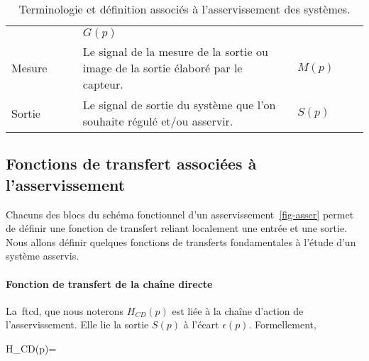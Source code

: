 \begin{table}[!h]
\begin{tabular}{@{}P{0.2\linewidth}m{0.6\linewidth}P{0.2\linewidth}@{}}
                & $G(p)$                                                \\
Mesure          & Le signal de la mesure de la sortie ou image de la sortie
                  élaboré par le capteur.
                & $M(p)$                                                \\
Sortie          & Le signal de sortie du système que l'on souhaite 
                  régulé et/ou asservir.
                & $S(p)$                                                \\
        \bottomrule
    \end{tabular}
    \caption{Terminologie et définition associés à l'asservissement des 
             systèmes.\label{tab-asser}}
\end{table}
\subsection{Fonctions de transfert associées à l'asservissement}
Chacuns des blocs du schéma fonctionnel d'un asservissement~\cref{fig-asser} 
permet de définir une fonction de transfert reliant localement une entrée 
et une sortie.
Nous allons définir quelques fonctions de transferts fondamentales à 
l'étude d'un système asservis.
\paragraph{Fonction de transfert de la chaîne directe}
La~\gls{ftcd}, que nous noterons $H_{CD}(p)$ est liée à 
la chaîne d'action de l'asservissement. Elle lie la sortie $S(p)$ à 
l'écart $\epsilon(p)$. Formellement,
\begin{bequation}
H_{CD}(p)=
\end{bequation}
